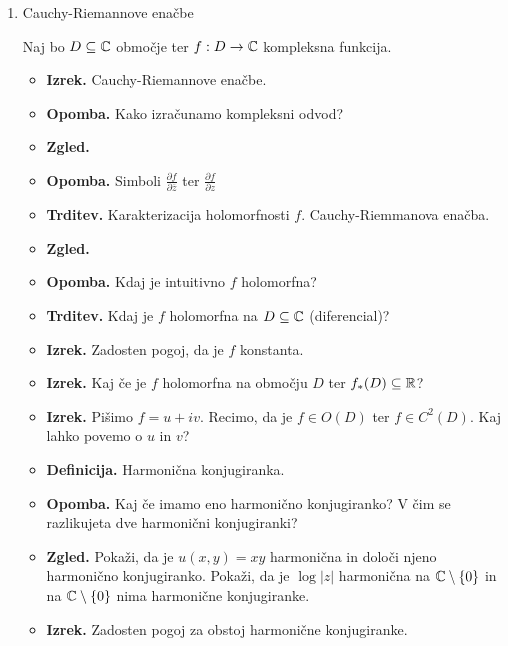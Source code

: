 \begin{enumerate}
    \item Cauchy-Riemannove enačbe
    
    Naj bo \(D \subseteq \mathbb{C}\) območje ter \(f: D \to \mathbb{C}\) kompleksna funkcija.
    \begin{itemize}
        \item \textbf{Izrek.} Cauchy-Riemannove enačbe. 
        \item \textbf{Opomba.} Kako izračunamo kompleksni odvod?
        \item \textbf{Zgled.} 
        \item \textbf{Opomba.} Simboli \(\frac{\partial f}{\partial \overline{z}}\) ter \(\frac{\partial f}{\partial z}\)
        \item \textbf{Trditev.} Karakterizacija holomorfnosti \(f\). Cauchy-Riemmanova enačba.
        \item \textbf{Zgled.} 
        \item \textbf{Opomba.} Kdaj je intuitivno \(f\) holomorfna?
        \item \textbf{Trditev.} Kdaj je \(f\) holomorfna na \(D \subseteq \mathbb{C}\) (diferencial)?
        \item \textbf{Izrek.} Zadosten pogoj, da je \(f\) konstanta.
        \item \textbf{Izrek.} Kaj če je \(f\) holomorfna na območju \(D\) ter \(f_{*}(D) \subseteq \mathbb{R}\)?
        \item \textbf{Izrek.} Pišimo \(f = u + iv\). Recimo, da je \(f \in O(D)\) ter \(f \in C^2(D)\). Kaj lahko povemo o \(u\) in \(v\)?
        \item \textbf{Definicija.} Harmonična konjugiranka.
        \item \textbf{Opomba.} Kaj če imamo eno harmonično konjugiranko? V čim se razlikujeta dve harmonični konjugiranki?
        \item \textbf{Zgled.} Pokaži, da je \(u(x, y) = xy\) harmonična in določi njeno harmonično konjugiranko.  Pokaži, da je \(\log |z|\) harmonična na \(\mathbb{C} \setminus \{0\}\) in na \(\mathbb{C} \setminus \{0\}\) nima harmonične konjugiranke.
        \item \textbf{Izrek.} Zadosten pogoj za obstoj harmonične konjugiranke.
    \end{itemize}


\end{enumerate}
